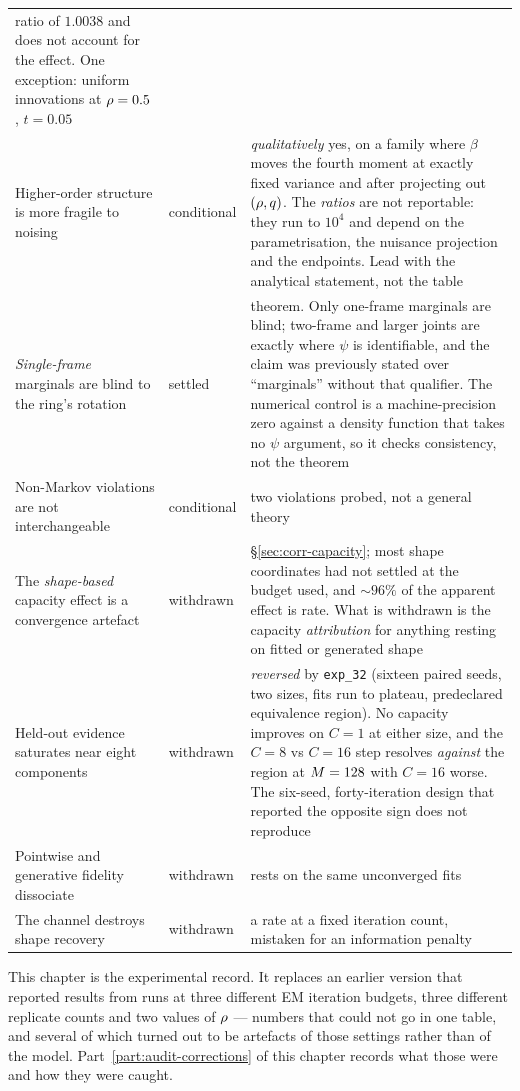 {\begin{longtable}{@{}p{}p{}p{}@{}}
  ratio of $1.0038$ and does not account for the effect. One exception: uniform
  innovations at $\rho=0.5$, $t=0.05$ \\
Higher-order structure is more fragile to noising & conditional &
  \emph{qualitatively} yes, on a family where $\beta$ moves the fourth moment at
  exactly fixed variance and after projecting out $(\rho,q)$. The
  \emph{ratios} are not reportable: they run to $10^4$ and depend on the
  parametrisation, the nuisance projection and the endpoints. Lead with the
  analytical statement, not the table \\
\emph{Single-frame} marginals are blind to the ring's rotation & settled &
  theorem. Only one-frame marginals are blind; two-frame and larger joints are
  exactly where $\psi$ is identifiable, and the claim was previously stated
  over ``marginals'' without that qualifier. The numerical control is a
  machine-precision zero against a density function that takes no $\psi$
  argument, so it checks consistency, not the theorem \\
Non-Markov violations are not interchangeable & conditional &
  two violations probed, not a general theory \\
The \emph{shape-based} capacity effect is a convergence artefact & withdrawn &
  \S\ref{sec:corr-capacity}; most shape coordinates had not settled at the
  budget used, and ${\sim}96\%$ of the apparent effect is rate. What is
  withdrawn is the capacity \emph{attribution} for anything resting on fitted
  or generated shape \\
Held-out evidence saturates near eight components & withdrawn &
  \emph{reversed} by \texttt{exp\_32} (sixteen paired seeds, two sizes, fits run
  to plateau, predeclared equivalence region). No capacity improves on $C=1$ at
  either size, and the $C{=}8$ vs $C{=}16$ step resolves \emph{against} the
  region at $M=128$ with $C=16$ worse. The six-seed, forty-iteration design
  that reported the opposite sign does not reproduce \\
Pointwise and generative fidelity dissociate & withdrawn &
  rests on the same unconverged fits \\
The channel destroys shape recovery & withdrawn &
  a rate at a fixed iteration count, mistaken for an information penalty \\
\bottomrule
\end{longtable}
}


This chapter is the experimental record. It replaces an earlier version that reported results
from runs at three different EM iteration budgets, three different replicate counts and two
values of $\rho$ --- numbers that could not go in one table, and several of which turned out to
be artefacts of those settings rather than of the model. Part~\ref{part:audit-corrections} of this chapter records what those were and how they
were caught.

